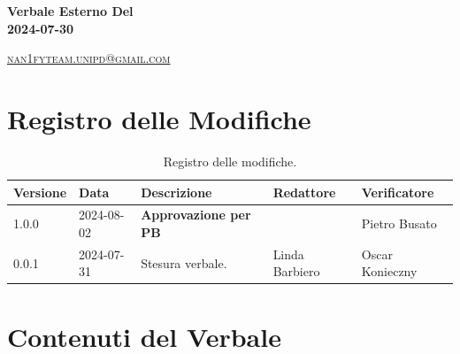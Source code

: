 \documentclass[8pt]{article}
\begin{document}
\begin{titlepage}
\begin{minipage}[t]{0.47\textwidth}
{		}
		\vspace{4mm}\vspace{4mm}
	\end{minipage}
	\vspace{4cm}
	\begin{center}
		\begin{flushright}
			{\fontsize{30pt}{52pt}\selectfont \textbf{Verbale Esterno Del\\2024-07-30\\}} %
		\end{flushright}
		\vspace{3cm}
	\end{center}
	\vspace{8.5 cm}
	{\small \textsc{\href{mailto: nan1fyteam.unipd@gmail.com}{nan1fyteam.unipd@gmail.com}}}
\end{titlepage}
\pagestyle{mystyle}

\section*{Registro delle Modifiche}
\begin{table}[ht!]	
	\centering
	\begin{tabular}{p{1.2cm} p{2cm} p{5cm} p{3cm} p{3cm}}
		\toprule
		\textbf{Versione}& \textbf{Data} & \textbf{Descrizione} & \textbf{Redattore} & \textbf{Verificatore} \\
		\midrule
  				1.0.0 & 2024-08-02 & \textbf{Approvazione per PB} & & Pietro Busato \\
				0.0.1 & 2024-07-31 & Stesura verbale. & Linda Barbiero & Oscar Konieczny
 			\\ %
		\bottomrule
	\end{tabular}
	\caption{Registro delle modifiche.}
	\label{table:Registro delle modifiche}
\end{table}
\newpage
\tableofcontents
\clearpage
\newpage
\justifying
\section{Contenuti del Verbale}
\end{document}

